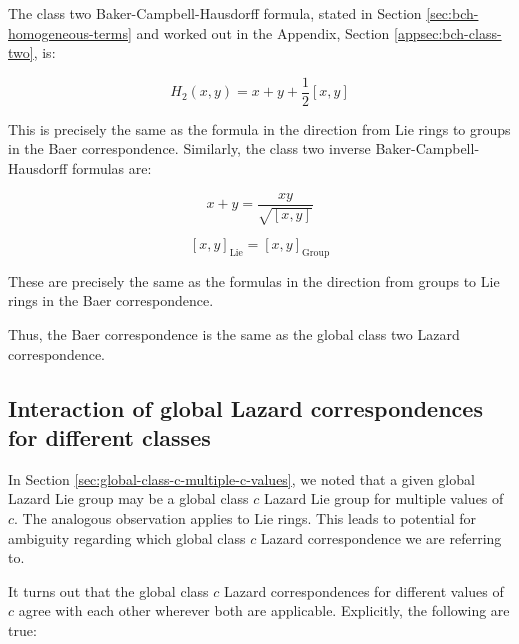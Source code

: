 The class two Baker-Campbell-Hausdorff formula, stated in Section
\ref{sec:bch-homogeneous-terms} and worked out in the Appendix,
Section \ref{appsec:bch-class-two}, is:

$$H_2(x,y) = x + y + \frac{1}{2}[x,y]$$

This is precisely the same as the formula in the direction from Lie
rings to groups in the Baer correspondence. Similarly, the class two
inverse Baker-Campbell-Hausdorff formulas are:

$$x + y = \frac{xy}{\sqrt{[x,y]}}$$

$$[x,y]_{\text{Lie}} = [x,y]_{\text{Group}}$$

These are precisely the same as the formulas in the direction from
groups to Lie rings in the Baer correspondence.

Thus, the Baer correspondence is the same as the global class two
Lazard correspondence.

\subsection{Interaction of global Lazard correspondences for different classes}

In Section \ref{sec:global-class-c-multiple-c-values}, we noted that a
given global Lazard Lie group may be a global class $c$ Lazard Lie
group for multiple values of $c$. The analogous observation applies to
Lie rings. This leads to potential for ambiguity regarding which
global class $c$ Lazard correspondence we are referring to.

It turns out that the global class $c$ Lazard correspondences for
different values of $c$ agree with each other wherever both are
applicable. Explicitly, the following are true:

